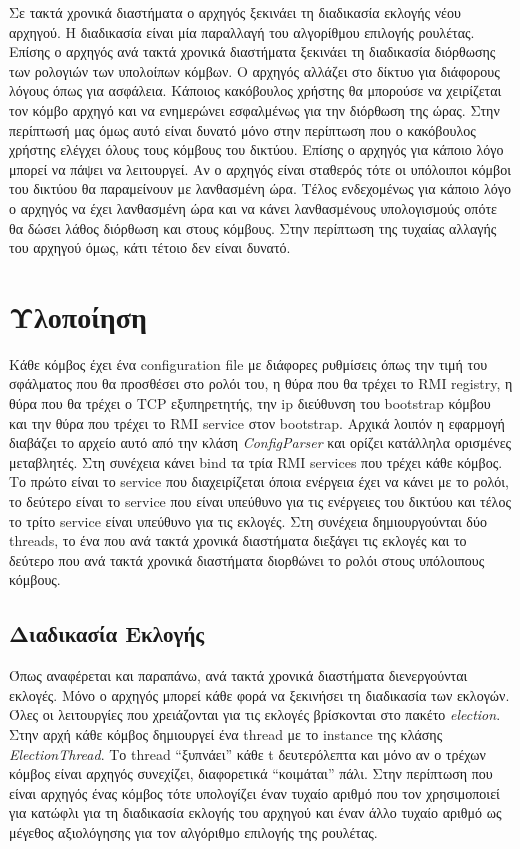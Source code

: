 \documentclass{article}
\begin{document}
Σε τακτά χρονικά διαστήματα ο αρχηγός ξεκινάει τη διαδικασία εκλογής νέου
αρχηγού. Η διαδικασία είναι μία παραλλαγή του αλγορίθμου επιλογής ρουλέτας.
Επίσης ο αρχηγός ανά τακτά χρονικά διαστήματα ξεκινάει τη διαδικασία διόρθωσης
των ρολογιών των υπολοίπων κόμβων. Ο αρχηγός αλλάζει στο δίκτυο για διάφορους
λόγους όπως για ασφάλεια. Κάποιος κακόβουλος χρήστης θα μπορούσε να χειρίζεται
τον κόμβο αρχηγό και να ενημερώνει εσφαλμένως για την διόρθωση της ώρας. Στην
περίπτωσή μας όμως αυτό είναι δυνατό μόνο στην περίπτωση που ο κακόβουλος
χρήστης ελέγχει όλους τους κόμβους του δικτύου. Επίσης
ο αρχηγός για κάποιο λόγο μπορεί να πάψει να λειτουργεί. Αν ο αρχηγός είναι
σταθερός τότε οι υπόλοιποι κόμβοι του δικτύου θα παραμείνουν με λανθασμένη ώρα.
Τέλος ενδεχομένως για κάποιο λόγο ο αρχηγός να έχει λανθασμένη ώρα και να κάνει
λανθασμένους υπολογισμούς οπότε θα δώσει λάθος διόρθωση και στους κόμβους. Στην
περίπτωση της τυχαίας αλλαγής του αρχηγού όμως, κάτι τέτοιο δεν είναι δυνατό.

\section{Υλοποίηση}
Κάθε κόμβος έχει ένα configuration file με διάφορες ρυθμίσεις όπως την τιμή του
σφάλματος που θα προσθέσει στο ρολόι του, η θύρα που θα τρέχει το RMI registry,
η θύρα που θα τρέχει ο TCP εξυπηρετητής, την ip διεύθυνση του bootstrap κόμβου
και την θύρα που τρέχει το RMI service στον bootstrap. Αρχικά λοιπόν η εφαρμογή
διαβάζει το αρχείο αυτό από την κλάση \emph{ConfigParser} και ορίζει κατάλληλα ορισμένες μεταβλητές. Στη συνέχεια
κάνει bind τα τρία RMI services που τρέχει κάθε κόμβος. Το πρώτο είναι το
service που διαχειρίζεται όποια ενέργεια έχει να κάνει με το ρολόι, το δεύτερο
είναι το service που είναι υπεύθυνο για τις ενέργειες του δικτύου και τέλος το
τρίτο service είναι υπεύθυνο για τις εκλογές. Στη συνέχεια δημιουργούνται δύο
threads, το ένα που ανά τακτά χρονικά διαστήματα διεξάγει τις εκλογές και το
δεύτερο που ανά τακτά χρονικά διαστήματα διορθώνει το ρολόι στους υπόλοιπους
κόμβους.

\subsection{Διαδικασία Εκλογής}
Όπως αναφέρεται και παραπάνω, ανά τακτά χρονικά διαστήματα διενεργούνται
εκλογές. Μόνο ο αρχηγός μπορεί κάθε φορά να ξεκινήσει τη διαδικασία των εκλογών.
Όλες οι λειτουργίες που χρειάζονται για τις εκλογές βρίσκονται στο πακέτο
\emph{election}. Στην αρχή κάθε κόμβος δημιουργεί ένα thread με το instance της
κλάσης \emph{ElectionThread}. Το thread ``ξυπνάει'' κάθε t δευτερόλεπτα και μόνο
αν ο τρέχων κόμβος είναι αρχηγός συνεχίζει, διαφορετικά ``κοιμάται'' πάλι. Στην
περίπτωση που είναι αρχηγός ένας κόμβος τότε υπολογίζει έναν τυχαίο αριθμό που
τον χρησιμοποιεί για κατώφλι για τη διαδικασία εκλογής του αρχηγού και έναν άλλο
τυχαίο αριθμό ως μέγεθος αξιολόγησης για τον αλγόριθμο επιλογής της ρουλέτας.
\end{document}
